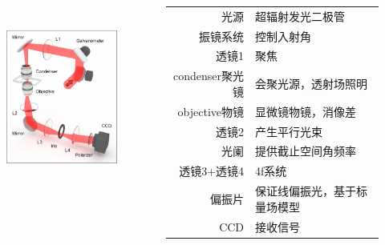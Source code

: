\documentclass[12pt,aspectratio=169]{beamer} %
\begin{document}
\begin{frame}
    \begin{columns}
        \begin{column}{0.3\textwidth}
            \begin{figure}
                \includegraphics[height=6cm]{images/2.png}
            \end{figure}
        \end{column}
        \begin{column}{0.6\textwidth}
            \small
            \begin{table}
                \begin{tabular}[c]{rl}
                    光源            & 超辐射发光二极管             \\
                    振镜系统        & 控制入射角                   \\
                    透镜1           & 聚焦                         \\
                    condenser聚光镜 & 会聚光源，透射场照明         \\
                    objective物镜   & 显微镜物镜，消像差           \\
                    透镜2           & 产生平行光束                 \\
                    光阑            & 提供截止空间角频率           \\
                    透镜3+透镜4     & 4f系统                       \\
                    偏振片          & 保证线偏振光，基于标量场模型 \\
                    CCD             & 接收信号                     \\
                \end{tabular}
            \end{table}
        \end{column}
    \end{columns}
\end{frame}
\end{document}
